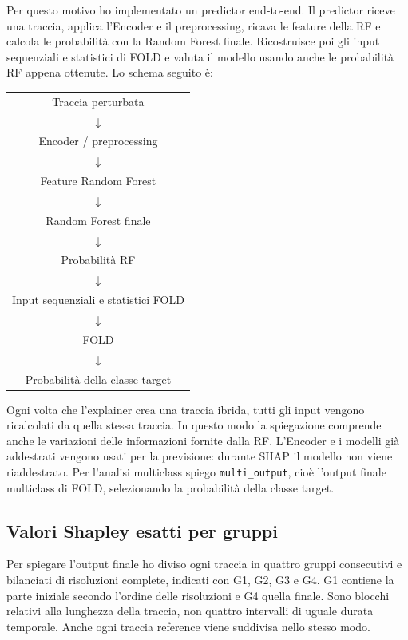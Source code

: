 \documentclass[11pt,a4paper]{article}
\begin{document}
Per questo motivo ho implementato un predictor end-to-end. Il predictor riceve una traccia, applica l'Encoder e il preprocessing, ricava le feature della RF e calcola le probabilità con la Random Forest finale. Ricostruisce poi gli input sequenziali e statistici di FOLD e valuta il modello usando anche le probabilità RF appena ottenute. Lo schema seguito è:
\begin{center}
\begin{tabular}{c}
Traccia perturbata \\
$\downarrow$ \\
Encoder / preprocessing \\
$\downarrow$ \\
Feature Random Forest \\
$\downarrow$ \\
Random Forest finale \\
$\downarrow$ \\
Probabilità RF \\
$\downarrow$ \\
Input sequenziali e statistici FOLD \\
$\downarrow$ \\
FOLD \\
$\downarrow$ \\
Probabilità della classe target
\end{tabular}
\end{center}
Ogni volta che l'explainer crea una traccia ibrida, tutti gli input vengono ricalcolati da quella stessa traccia. In questo modo la spiegazione comprende anche le variazioni delle informazioni fornite dalla RF. L'Encoder e i modelli già addestrati vengono usati per la previsione: durante SHAP il modello non viene riaddestrato. Per l'analisi multiclass spiego \texttt{multi\_output}, cioè l'output finale multiclass di FOLD, selezionando la probabilità della classe target.

\subsection{Valori Shapley esatti per gruppi}
Per spiegare l'output finale ho diviso ogni traccia in quattro gruppi consecutivi e bilanciati di risoluzioni complete, indicati con G1, G2, G3 e G4. G1 contiene la parte iniziale secondo l'ordine delle risoluzioni e G4 quella finale. Sono blocchi relativi alla lunghezza della traccia, non quattro intervalli di uguale durata temporale. Anche ogni traccia reference viene suddivisa nello stesso modo.
\end{document}
